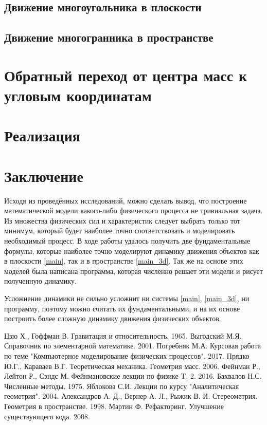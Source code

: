 \documentclass[12pt, a4paper]{extarticle}
\numberwithin{equation}{section}
\begin{document}
\subsection{Движение многоугольника в плоскости}
      

\subsection{Движение многогранника в пространстве}


\section{Обратный переход от центра масс к угловым координатам}
 
 
\section{Реализация} 

  

\newpage
\section*{Заключение}

Исходя из проведённых исследований, можно сделать вывод, что построение математической модели какого-либо физического процесса не тривиальная задача. Из множества физических сил и характеристик следует выбрать только тот минимум, который будет наиболее точно соответствовать и моделировать необходимый процесс. В ходе работы удалось получить две фундаментальные формулы, которые наиболее точно моделируют динамику движения объектов как в плоскости \eqref{main}, так и в пространстве \eqref{main_3d}. Так же на основе этих моделей была написана программа, которая численно решает эти модели и рисует полученную динамику.

Усложнение динамики не сильно усложнит ни системы \eqref{main}, \eqref{main_3d}, ни программу, поэтому можно считать их фундаментальными, и на их основе построить более сложную динамику движения физических объектов.

\newpage

\begin{thebibliography}{**}
	  
	Цзю Х., Гоффман В. Гравитация и относительность. 1965.
	Выгодский М.Я. Справочник по элементарной математике. 2001.
	Погребняк М.А. Курсовая работа по теме "Компьютерное моделирование физических процессов". 2017.
	 Прядко Ю.Г., Караваев В.Г. Теоретическая механика. Геометрия масс. 2006.
	Фейнман Р., Лейтон Р., Сэндс М. Фейнмановские лекции по физике T. 2. 2016.
	 Бахвалов Н.С.  Численные методы. 1975. 
	 Яблокова С.И.   Лекции по курсу "Аналитическая геометрия". 2004. 
	Александров А. Д., Вернер А. Л., Рыжик В. И.  Стереометрия. Геометрия в пространстве. 1998. 
	Мартин Ф. Рефакторинг. Улучшение существующего кода. 2008.
\end{thebibliography}
\end{document}
